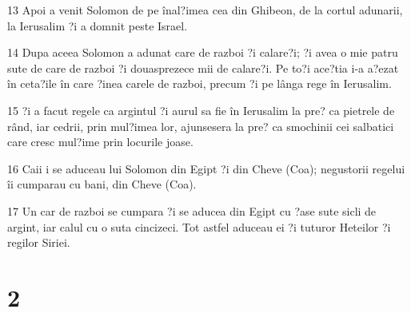 \par 13 Apoi a venit Solomon de pe înal?imea cea din Ghibeon, de la cortul adunarii, la Ierusalim ?i a domnit peste Israel.
\par 14 Dupa aceea Solomon a adunat care de razboi ?i calare?i; ?i avea o mie patru sute de care de razboi ?i douasprezece mii de calare?i. Pe to?i ace?tia i-a a?ezat în ceta?ile în care ?inea carele de razboi, precum ?i pe lânga rege în Ierusalim.
\par 15 ?i a facut regele ca argintul ?i aurul sa fie în Ierusalim la pre? ca pietrele de rând, iar cedrii, prin mul?imea lor, ajunsesera la pre? ca smochinii cei salbatici care cresc mul?ime prin locurile joase.
\par 16 Caii i se aduceau lui Solomon din Egipt ?i din Cheve (Coa); negustorii regelui îi cumparau cu bani, din Cheve (Coa).
\par 17 Un car de razboi se cumpara ?i se aducea din Egipt cu ?ase sute sicli de argint, iar calul cu o suta cincizeci. Tot astfel aduceau ei ?i tuturor Heteilor ?i regilor Siriei.

\chapter{2}

